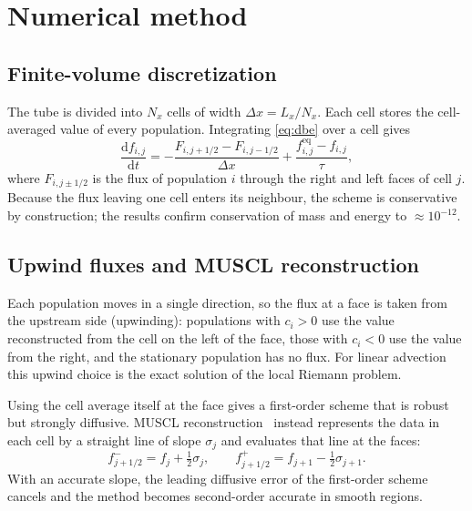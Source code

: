 \documentclass[11pt]{article}
\newcommand{\feq}{f^{\mathrm{eq}}}
\begin{document}
\section{Numerical method}
\label{sec:method}

\subsection{Finite-volume discretization}
The tube is divided into $N_x$ cells of width $\Delta x = L_x/N_x$.  Each cell stores the
cell-averaged value of every population.  Integrating \cref{eq:dbe} over a cell gives
\begin{equation}
\frac{\mathrm{d}f_{i,j}}{\mathrm{d}t}
= -\frac{F_{i,j+1/2} - F_{i,j-1/2}}{\Delta x} + \frac{\feq_{i,j} - f_{i,j}}{\tau},
\label{eq:fv}
\end{equation}
where $F_{i,j\pm1/2}$ is the flux of population $i$ through the right and left faces of cell $j$.
Because the flux leaving one cell enters its neighbour, the scheme is conservative by
construction; the results confirm conservation of mass and energy to $\approx10^{-12}$.

\subsection{Upwind fluxes and MUSCL reconstruction}
Each population moves in a single direction, so the flux at a face is taken from the
upstream side (upwinding): populations with $c_i > 0$ use the value reconstructed from the
cell on the left of the face, those with $c_i < 0$ use the value from the right, and the
stationary population has no flux.  For linear advection this upwind choice is the exact
solution of the local Riemann problem.

Using the cell average itself at the face gives a first-order scheme that is robust but
strongly diffusive.  MUSCL reconstruction~\citep{vanLeer1979} instead represents the data in
each cell by a straight line of slope $\sigma_j$ and evaluates that line at the faces:
\begin{equation}
f^{-}_{j+1/2} = f_j + \tfrac12\sigma_j, \qquad f^{+}_{j+1/2} = f_{j+1} - \tfrac12\sigma_{j+1}.
\label{eq:muscl}
\end{equation}
With an accurate slope, the leading diffusive error of the first-order scheme cancels and
the method becomes second-order accurate in smooth regions.
\end{document}
